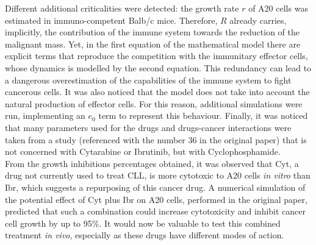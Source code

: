 Different additional criticalities were detected: the growth rate $r$ of A20 cells was estimated in immuno-competent Balb/c mice. Therefore, $R$ already carries, implicitly, the contribution of the immune system towards the reduction of the malignant mass. Yet, in the first equation of the mathematical model there are explicit terms that reproduce the competition with the immunitary effector cells, whose dynamics is modelled by the second equation. This redundancy can lead to a dangerous overestimation of the capabilities of the immune system to fight cancerous cells. It was also noticed that the model does not take into account the natural production of effector cells. For this reason, additional simulations were run, implementing an $e_{0}$ term to represent this behaviour. Finally, it was noticed that many parameters used for the drugs and drugs-cancer interactions were taken from a study (referenced with the number 36 in the original paper) that is not concerned with Cytarabine or Ibrutinib, but with Cyclophosphamide. \\
From the growth inhibitions percentages obtained, it was observed that Cyt, a drug not currently used to treat CLL, is more cytotoxic to A20 cells \textit{in vitro} than Ibr, which suggests a repurposing of this cancer drug. A numerical simulation of the potential effect of Cyt plus Ibr on A20 cells, performed in the original paper, predicted that such a combination could increase cytotoxicity and inhibit cancer cell growth by up to 95\%. It would now be valuable to test this combined treatment \textit{in vivo}, especially as these drugs have different modes of action. 
